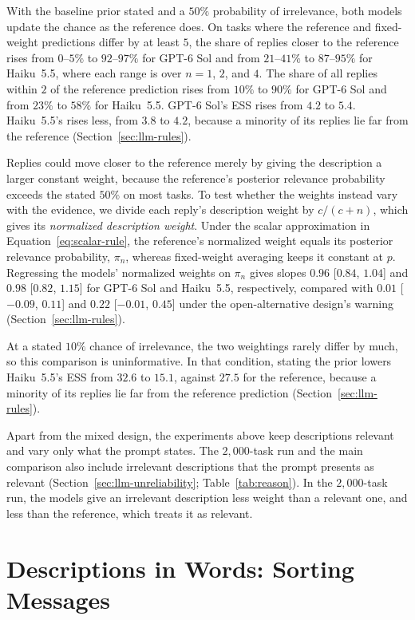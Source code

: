 With the baseline prior stated and a $50\%$ probability of irrelevance, both models update the chance as the reference does. On tasks where the reference and fixed-weight predictions differ by at least $5$, the share of replies closer to the reference rises from $0$--$5\%$ to $92$--$97\%$ for GPT-6 Sol and from $21$--$41\%$ to $87$--$95\%$ for Haiku~5.5, where each range is over $n=1$, $2$, and $4$. The share of all replies within $2$ of the reference prediction rises from $10\%$ to $90\%$ for GPT-6 Sol and from $23\%$ to $58\%$ for Haiku~5.5. GPT-6 Sol's ESS rises from $4.2$ to $5.4$. Haiku~5.5's rises less, from $3.8$ to $4.2$, because a minority of its replies lie far from the reference (Section~\ref{sec:llm-rules}).

Replies could move closer to the reference merely by giving the description a larger constant weight, because the reference's posterior relevance probability exceeds the stated $50\%$ on most tasks. To test whether the weights instead vary with the evidence, we divide each reply's description weight by $c/(c+n)$, which gives its \emph{normalized description weight}. Under the scalar approximation in Equation~\eqref{eq:scalar-rule}, the reference's normalized weight equals its posterior relevance probability, $\pi_n$, whereas fixed-weight averaging keeps it constant at $p$. Regressing the models' normalized weights on $\pi_n$ gives slopes $0.96$ [$0.84$, $1.04$] and $0.98$ [$0.82$, $1.15$] for GPT-6 Sol and Haiku~5.5, respectively, compared with $0.01$ [$-0.09$, $0.11$] and $0.22$ [$-0.01$, $0.45$] under the open-alternative design's warning (Section~\ref{sec:llm-rules}).

At a stated $10\%$ chance of irrelevance, the two weightings rarely differ by much, so this comparison is uninformative. In that condition, stating the prior lowers Haiku~5.5's ESS from $32.6$ to $15.1$, against $27.5$ for the reference, because a minority of its replies lie far from the reference prediction (Section~\ref{sec:llm-rules}).

Apart from the mixed design, the experiments above keep descriptions relevant and vary only what the prompt states. The $2{,}000$-task run and the main comparison also include irrelevant descriptions that the prompt presents as relevant (Section~\ref{sec:llm-unreliability}; Table~\ref{tab:reason}). In the $2{,}000$-task run, the models give an irrelevant description less weight than a relevant one, and less than the reference, which treats it as relevant.

\section{Descriptions in Words: Sorting Messages}\label{sec:semantic}

